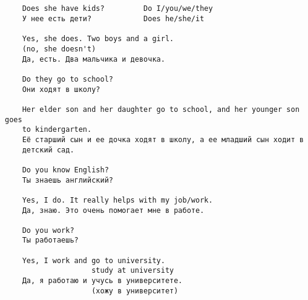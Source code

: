 \subsection*{}
\begin{verbatim}
    Does she have kids?         Do I/you/we/they
    У нее есть дети?            Does he/she/it

    Yes, she does. Two boys and a girl.
    (no, she doesn't)
    Да, есть. Два мальчика и девочка.

    Do they go to school?
    Они ходят в школу?

    Her elder son and her daughter go to school, and her younger son goes 
    to kindergarten.
    Её старший сын и ее дочка ходят в школу, а ее младший сын ходит в
    детский сад.

    Do you know English?
    Ты знаешь английский?

    Yes, I do. It really helps with my job/work.
    Да, знаю. Это очень помогает мне в работе.

    Do you work?
    Ты работаешь?

    Yes, I work and go to university.
                    study at university
    Да, я работаю и учусь в университете.
                    (хожу в университет)
\end{verbatim}